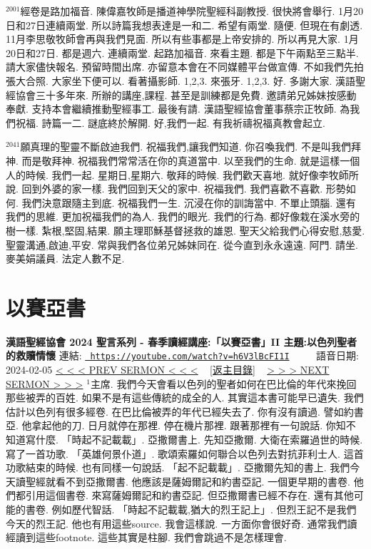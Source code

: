 \documentclass{book}
\begin{document}
$^{2001}$經卷是路加福音.
陳偉嘉牧師是播道神學院聖經科副教授.
很快將會舉行.
1月20日和27日連續兩堂.
所以詩篇我想表達是一和二.
希望有兩堂.
隨便.
但現在有劇透.
11月李思敬牧師會再與我們見面.
所以有些事都是上帝安排的.
所以再見大家.
1月20日和27日.
都是週六.
連續兩堂.
起路加福音.
來看主題.
都是下午兩點至三點半.
請大家儘快報名.
預留時間出席.
亦留意本會在不同媒體平台做宣傳.
不如我們先拍張大合照.
大家坐下便可以.
看著攝影師.
1,2,3.
來張牙.
1,2,3.
好.
多謝大家.
漢語聖經協會三十多年來.
所辦的講座,課程.
甚至是訓練都是免費.
邀請弟兄姊妹按感動奉獻.
支持本會繼續推動聖經事工.
最後有請.
漢語聖經協會董事蔡宗正牧師.
為我們祝福.
詩篇一二.
謎底終於解開.
好,我們一起.
有我祈禱祝福真教會起立.

$^{2041}$願真理的聖靈不斷啟迪我們.
祝福我們,讓我們知道.
你召喚我們.
不是叫我們拜神.
而是敬拜神.
祝福我們常常活在你的真道當中.
以至我們的生命.
就是這樣一個人的時候.
我們一起.
星期日,星期六.
敬拜的時候.
我們歡天喜地.
就好像李牧師所說.
回到外婆的家一樣.
我們回到天父的家中.
祝福我們.
我們喜歡不喜歡.
形勢如何.
我們決意跟隨主到底.
祝福我們一生.
沉浸在你的訓誨當中.
不單止頭腦.
還有我們的思維.
更加祝福我們的為人.
我們的眼光.
我們的行為.
都好像栽在溪水旁的樹一樣.
紮根,堅固,結果.
願主理耶穌基督拯救的雄恩.
聖天父給我們心得安慰,慈愛.
聖靈溝通,啟迪,平安.
常與我們各位弟兄姊妹同在.
從今直到永永遠遠.
阿門.
請坐.
麥美娟議員.
法定人數不足.
\newpage



\section{以賽亞書}
\label{sec:h6V3lBcFI1I}
\textbf{漢語聖經協會 2024 聖言系列 - 春季讀經講座:「以賽亞書」II 主題:以色列聖者的救贖情懷}
\newline
\newline
連結: \href{https://youtube.com/watch?v=h6V3lBcFI1I}{\texttt{ https://youtube.com/watch?v=h6V3lBcFI1I}} ~~~~ 語音日期: 2024-02-05 
\newline
\newline
\hyperref[sec:A_3yEYQkm9Y]{\small{< < < PREV SERMON < < <}}
~
\hyperref[sec:index]{\small{[返主目錄]}}
~
\hyperref[sec:lB_bfqbs0xw]{\small{> > > NEXT SERMON > > >}}
\newline
\newline
$^{1}$主席.
我們今天會看以色列的聖者如何在巴比倫的年代來挽回那些被弄的百姓.
如果不是有這些傳統的成全的人.
其實這本書可能早已遺失.
我們估計以色列有很多經卷.
在巴比倫被弄的年代已經失去了.
你有沒有讀過.
譬如約書亞.
他拿起他的刀.
日月就停在那裡.
停在機片那裡.
跟著那裡有一句說話.
你知不知道寫什麼.
「時起不記載載」.
亞撒爾書上.
先知亞撒爾.
大衛在索羅過世的時候.
寫了一首功歌.
「英雄何景仆道」.
歌頌索羅如何聯合以色列去對抗菲利士人.
這首功歌結束的時候.
也有同樣一句說話.
「起不記載載」.
亞撒爾先知的書上.
我們今天讀聖經就看不到亞撒爾書.
他應該是薩姆爾記和約書亞記.
一個更早期的書卷.
他們都引用這個書卷.
來寫薩姆爾記和約書亞記.
但亞撒爾書已經不存在.
還有其他可能的書卷.
例如歷代智話.
「時起不記載載,猶大的烈王記上」.
但烈王記不是我們今天的烈王記.
他也有用這些source.
我會這樣說.
一方面你會很好奇.
通常我們讀經讀到這些footnote.
這些其實是柱腳.
我們會跳過不是怎樣理會.
\end{document}
